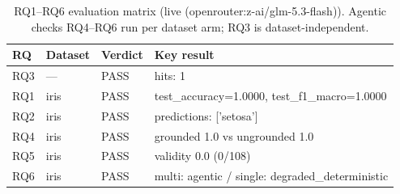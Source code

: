 \begin{table}[H]
\centering\small
\caption{RQ1--RQ6 evaluation matrix (live (openrouter:z-ai/glm-5.3-flash)). Agentic checks RQ4--RQ6 run per dataset arm; RQ3 is dataset-independent.}
\label{tab:rq-matrix-live-openrouter-glm-iris-prefixfix-20260903}
\begin{tabular}{llll}
\toprule
RQ & Dataset & Verdict & Key result \\
\midrule
RQ3 & — & PASS & hits: 1 \\
RQ1 & iris & PASS & test\_accuracy=1.0000, test\_f1\_macro=1.0000 \\
RQ2 & iris & PASS & predictions: ['setosa'] \\
RQ4 & iris & PASS & grounded 1.0 vs ungrounded 1.0 \\
RQ5 & iris & PASS & validity 0.0 (0/108) \\
RQ6 & iris & PASS & multi: agentic / single: degraded\_deterministic \\
\bottomrule
\end{tabular}
\end{table}
